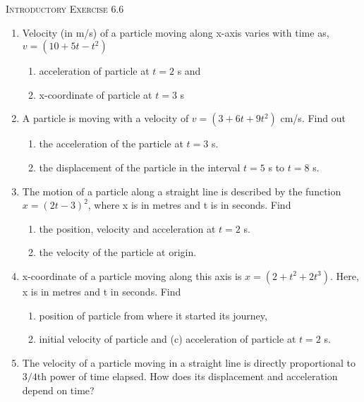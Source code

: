 \documentclass{article}
\begin{document}
\vspace*{10 mm}
\begin{center}
    \textsc{Introductory Exercise 6.6}
\end{center}
\begin{enumerate}
    \item Velocity (in m/s) of a particle moving along x-axis varies with time as, $v = (10 + 5t - t^2)$
    \begin{enumerate}
        \item acceleration of particle at $t = 2$ s and
        \item x-coordinate of particle at $t = 3$ s
    \end{enumerate}

    \item A particle is moving with a velocity of $v = (3 + 6t + 9t^2)$ cm/s. Find out
    \begin{enumerate}
        \item the acceleration of the particle at $t = 3$ s.
        \item the displacement of the particle in the interval $t = 5$ s to $t = 8$ s.
    \end{enumerate}

    \item The motion of a particle along a straight line is described by the function $x = (2t - 3)^2$, where x is in metres and t is in seconds. Find
    \begin{enumerate}
        \item the position, velocity and acceleration at $t = 2$ s.
        \item the velocity of the particle at origin.
    \end{enumerate}

    \item x-coordinate of a particle moving along this axis is $x = (2 + t^2 + 2t^3)$. Here, x is in metres and t in seconds. Find
    \begin{enumerate}
        \item position of particle from where it started its journey,
        \item initial velocity of particle and (c) acceleration of particle at $t = 2$ s.
    \end{enumerate}

    \item The velocity of a particle moving in a straight line is directly proportional to $3/4$th power of time elapsed. How does its displacement and acceleration depend on time?
\end{enumerate}
\end{document}
